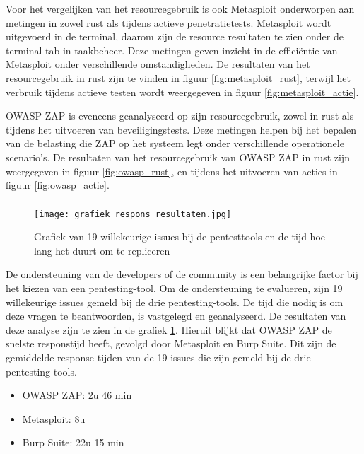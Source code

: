 Voor het vergelijken van het resourcegebruik is ook Metasploit onderworpen aan metingen in zowel rust als tijdens actieve 
penetratietests. Metasploit wordt uitgevoerd in de terminal, daarom zijn de resource resultaten te zien onder de terminal tab 
in taakbeheer. Deze metingen geven inzicht in de efficiëntie van Metasploit onder verschillende omstandigheden. De 
resultaten van het resourcegebruik in rust zijn te vinden in figuur \ref{fig:metasploit_rust}, terwijl het verbruik tijdens 
actieve testen wordt weergegeven in figuur \ref{fig:metasploit_actie}.

OWASP ZAP is eveneens geanalyseerd op zijn resourcegebruik, zowel in rust als tijdens het uitvoeren van beveiligingstests. 
Deze metingen helpen bij het bepalen van de belasting die ZAP op het systeem legt onder verschillende operationele scenario's. 
De resultaten van het resourcegebruik van OWASP ZAP in rust zijn weergegeven in figuur \ref{fig:owasp_rust}, en tijdens het 
uitvoeren van acties in figuur \ref{fig:owasp_actie}.

\subsubsection{}
\begin{figure}
    \centering
    \texttt{[image: grafiek\_respons\_resultaten.jpg]}
    \caption[Grafiek van 19 willekeurige issues bij de pentesttools en de tijd hoe lang het duurt om te repliceren]{Grafiek van 19 willekeurige issues bij de pentesttools en de tijd hoe lang het duurt om te repliceren}
    \label{fig:respons_grafiek}
\end{figure}
De ondersteuning van de developers of de community is een belangrijke factor bij het kiezen van een pentesting-tool. Om de ondersteuning 
te evalueren, zijn 19 willekeurige issues gemeld bij de drie pentesting-tools. De tijd die nodig is om deze
vragen te beantwoorden, is vastgelegd en geanalyseerd. De resultaten van deze analyse zijn te zien in de
grafiek \ref{fig:respons_grafiek}. Hieruit blijkt dat OWASP ZAP de snelste responstijd heeft, gevolgd door Metasploit en
Burp Suite. Dit zijn de gemiddelde response tijden van de 19 issues die zijn gemeld bij de drie pentesting-tools.
\begin{itemize}
    \item OWASP ZAP: 2u 46 min
    \item Metasploit: 8u
    \item Burp Suite: 22u 15 min
\end{itemize}

